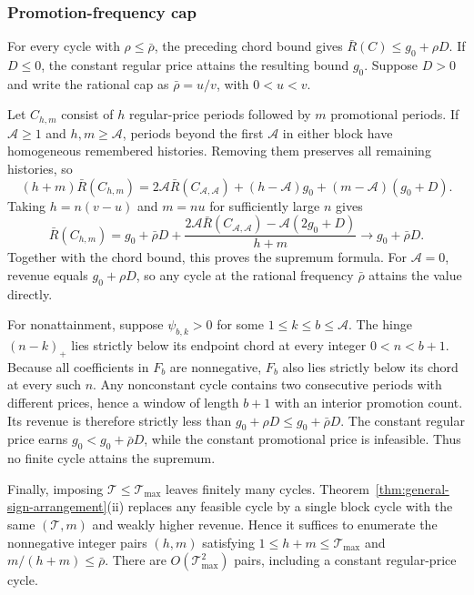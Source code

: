 \begingroup\color{black}
\subsubsection{Promotion-frequency cap}
\label{app:convex-frequency-cap}
For every cycle with \(\rho\le\bar\rho\), the preceding chord bound gives \(\bar R(C)\le g_0+\rho D\). If \(D\le0\), the constant regular price attains the resulting bound \(g_0\). Suppose \(D>0\) and write the rational cap as \(\bar\rho=u/v\), with \(0<u<v\).

Let \(C_{h,m}\) consist of \(h\) regular-price periods followed by \(m\) promotional periods. If \(\mathcal A\ge1\) and \(h,m\ge\mathcal A\), periods beyond the first \(\mathcal A\) in either block have homogeneous remembered histories. Removing them preserves all remaining histories, so
\[
    (h+m)\bar R(C_{h,m})
    =2\mathcal A\bar R(C_{\mathcal A,\mathcal A})
     +(h-\mathcal A)g_0+(m-\mathcal A)(g_0+D).
\]
Taking \(h=n(v-u)\) and \(m=nu\) for sufficiently large \(n\) gives
\[
    \bar R(C_{h,m})
    =g_0+\bar\rho D+
      \frac{2\mathcal A\bar R(C_{\mathcal A,\mathcal A})
       -\mathcal A(2g_0+D)}{h+m}
    \longrightarrow g_0+\bar\rho D.
\]
Together with the chord bound, this proves the supremum formula. For \(\mathcal A=0\), revenue equals \(g_0+\rho D\), so any cycle at the rational frequency \(\bar\rho\) attains the value directly.

For nonattainment, suppose \(\psi_{b,k}>0\) for some \(1\le k\le b\le\mathcal A\). The hinge \((n-k)_+\) lies strictly below its endpoint chord at every integer \(0<n<b+1\). Because all coefficients in \(F_b\) are nonnegative, \(F_b\) also lies strictly below its chord at every such \(n\). Any nonconstant cycle contains two consecutive periods with different prices, hence a window of length \(b+1\) with an interior promotion count. Its revenue is therefore strictly less than \(g_0+\rho D\le g_0+\bar\rho D\). The constant regular price earns \(g_0<g_0+\bar\rho D\), while the constant promotional price is infeasible. Thus no finite cycle attains the supremum.

Finally, imposing \(\mathcal T\le\mathcal T_{\max}\) leaves finitely many cycles. Theorem~\ref{thm:general-sign-arrangement}(ii) replaces any feasible cycle by a single block cycle with the same \((\mathcal T,m)\) and weakly higher revenue. Hence it suffices to enumerate the nonnegative integer pairs \((h,m)\) satisfying \(1\le h+m\le\mathcal T_{\max}\) and \(m/(h+m)\le\bar\rho\). There are \(O(\mathcal T_{\max}^2)\) pairs, including a constant regular-price cycle.

